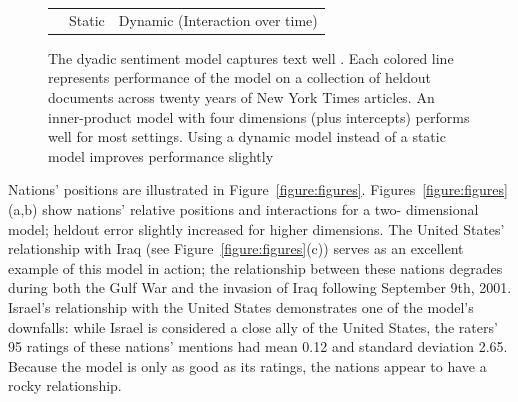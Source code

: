 \begin{figure}
\begin{tabular}{m{2cm}cc}
  \\ & Static & Dynamic (Interaction over time) \\
\end{tabular}
   \caption{The dyadic sentiment model captures text well . Each
     colored line represents performance of the model on a collection
     of heldout documents across twenty years of New York Times
     articles. An inner-product model with four dimensions (plus
     intercepts) performs well for most settings.  Using a dynamic
     model instead of a static model improves performance slightly }
\end{figure}

Nations' positions are illustrated in Figure~\ref{figure:figures}.
Figures~\ref{figure:figures}(a,b) show nations' relative positions
and interactions for a two- dimensional model; heldout error slightly
increased for higher dimensions. The United States' relationship with
Iraq (see Figure~\ref{figure:figures}(c)) serves as an excellent
example of this model in action; the relationship between these
nations degrades during both the Gulf War and the invasion of Iraq
following September 9th, 2001.  Israel's relationship with the United
States demonstrates one of the model's downfalls: while Israel is
considered a close ally of the United States, the raters' 95 ratings
of these nations' mentions had mean 0.12 and standard deviation
2.65.  Because the model is only as good as its ratings, the nations
appear to have a rocky relationship.






